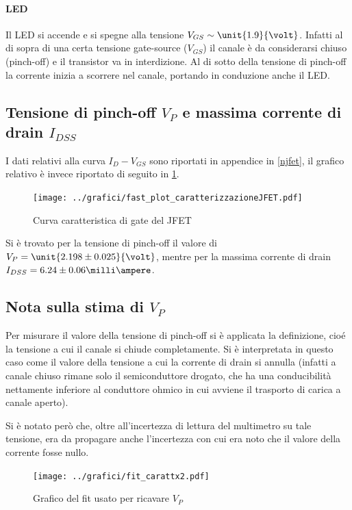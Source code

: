 \documentclass[10pt,a4paper]{article}
\begin{document}
\paragraph{LED} Il LED si accende e si spegne alla tensione $V_{GS} \sim \unit{1.9}{\volt}$. Infatti al di sopra di una certa tensione gate-source ($V_{GS}$) il canale è da considerarsi chiuso (pinch-off) e il transistor va in interdizione. Al di sotto della tensione di pinch-off la corrente inizia a scorrere nel canale, portando in conduzione anche il LED.

\subsection{Tensione di pinch-off $V_P$ e massima corrente di drain $I_{DSS}$}
I dati relativi alla curva $I_D - V_{GS}$ sono riportati in appendice in \tablename{\ref{njfet}}, il grafico relativo è invece riportato di seguito in \figurename{\ref{fig:njfet}}.

\begin{figure}[h!]
	\centering
	\texttt{[image: ../grafici/fast\_plot\_caratterizzazioneJFET.pdf]}
	\caption{Curva caratteristica di gate del JFET}
	\label{fig:njfet}
\end{figure}

Si è trovato per la tensione di pinch-off il valore di $V_P = \unit{2.198 \pm 0.025}{\volt} $, mentre per la massima corrente di drain $I_{DSS} = {6.24 \pm 0.06}{\milli\ampere} $.

\subsection{Nota sulla stima di $V_P$}
Per misurare il valore della tensione di pinch-off si è applicata la definizione, cioé la tensione a cui il canale si chiude completamente. Si è interpretata in questo caso come il valore della tensione a cui la corrente di drain si annulla (infatti a canale chiuso rimane solo il semiconduttore drogato, che ha una conducibilità nettamente inferiore al conduttore ohmico in cui avviene il trasporto di carica a canale aperto).

Si è notato però che, oltre all'incertezza di lettura del multimetro su tale tensione, era da propagare anche l'incertezza con cui era noto che il valore della corrente fosse nullo.

\begin{figure}[h!]
	\centering
	\texttt{[image: ../grafici/fit\_carattx2.pdf]}
	\caption{Grafico del fit usato per ricavare $V_P$}
	\label{fig:vpfit}
\end{figure}
\end{document}
